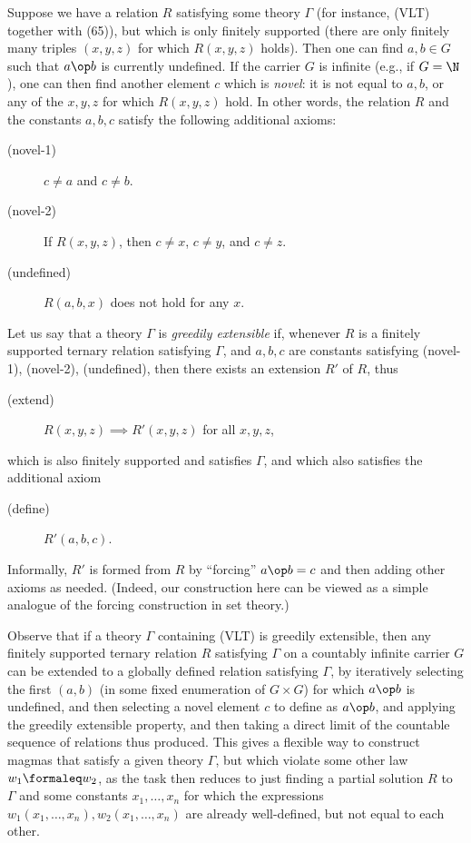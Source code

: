 Suppose we have a relation $R$ satisfying some theory $\Gamma$ (for instance, (VLT) together with (65)), but which is only finitely supported (there are only finitely many triples $(x,y,z)$ for which $R(x,y,z)$ holds).  Then one can find $a,b \in G$ such that $a \op b$ is currently undefined.  If the carrier $G$ is infinite (e.g., if $G = \N$), one can then find another element $c$ which is \emph{novel}: it is not equal to $a, b$, or any of the $x,y,z$ for which $R(x,y,z)$ hold. In other words, the relation $R$ and the constants $a,b,c$ satisfy the following additional axioms:
\begin{description}
  \item[(novel-1)] $c \neq a$ and $c \neq b$.
  \item[(novel-2)] If $R(x,y,z)$, then $c \neq x$, $c \neq y$, and $c \neq z$.
  \item[(undefined)]  $R(a,b,x)$ does not hold for any $x$.
\end{description}

Let us say that a theory $\Gamma$ is \emph{greedily extensible} if, whenever $R$ is a finitely supported ternary relation satisfying $\Gamma$, and $a,b,c$ are constants satisfying (novel-1), (novel-2), (undefined), then there exists an extension $R'$ of $R$, thus
\begin{description}
  \item[(extend)] $R(x,y,z) \implies R'(x,y,z)$ for all $x,y,z$,
\end{description}
which is also finitely supported and satisfies $\Gamma$, and which also satisfies the additional axiom
\begin{description}
  \item[(define)] $R'(a,b,c)$.
\end{description}
Informally, $R'$ is formed from $R$ by ``forcing'' $a \op b = c$ and then adding other axioms as needed. (Indeed, our construction here can be viewed as a simple analogue of the forcing construction in set theory.)

Observe that if a theory $\Gamma$ containing (VLT) is greedily extensible, then any finitely supported ternary relation $R$ satisfying $\Gamma$ on a countably infinite carrier $G$ can be extended to a globally defined relation satisfying $\Gamma$, by iteratively selecting the first $(a,b)$ (in some fixed enumeration of $G \times G$) for which $a \op b$ is undefined, and then selecting a novel element $c$ to define as $a \op b$, and applying the greedily extensible property, and then taking a direct limit of the countable sequence of relations thus produced.  This gives a flexible way to construct magmas that satisfy a given theory $\Gamma$, but which violate some other law $w_1 \formaleq w_2$, as the task then reduces to just finding a partial solution $R$ to $\Gamma$ and some constants $x_1,\dots,x_n$ for which the expressions $w_1(x_1,\dots,x_n), w_2(x_1,\dots,x_n)$ are already well-defined, but not equal to each other.

